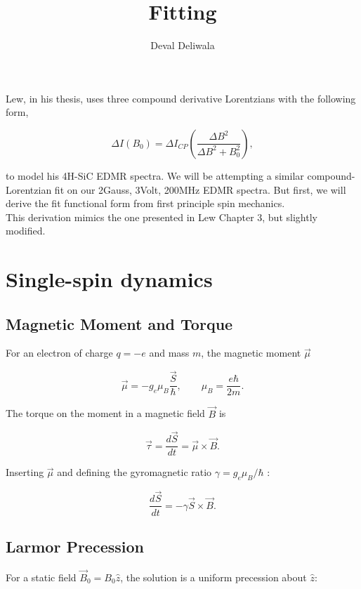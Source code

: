 \documentclass[svgnames]{article}
\title{Fitting}
\author{Deval Deliwala}
\begin{document}
\maketitle


Lew, in his thesis, uses three compound derivative Lorentzians with the following form, 

\[
    \Delta I ( B_0 ) = \Delta I_{CP} \left( \frac{\Delta B^2}{\Delta B^2 +
    B_0^2} \right),  
\] \vspace{3px}

to model his 4H-SiC EDMR spectra. We will be attempting a similar
compound-Lorentzian fit on our 2Gauss, 3Volt, 200MHz EDMR spectra. But first, we
will derive the fit functional form from first principle spin mechanics. \\

This derivation mimics the one presented in Lew Chapter 3, but slightly
modified. 

\section{Single-spin dynamics}

\subsection{Magnetic Moment and Torque}

For an electron of charge $q = -e$ and mass $m$, the magnetic moment $\vec{\mu}$ 

\[
    \vec{\mu} = -g_e \mu_B \frac{\vec{S}}{\hbar}, \qquad \mu_B =
    \frac{e\hbar}{2m}. 
\] \vspace{3px}

The torque on the moment in a magnetic field  $\vec{B}$ is 

\[
\vec{\tau} = \frac{d \vec{S}}{dt} = \vec{\mu} \times \vec{B}.
\] \vspace{3px}

Inserting $\vec{\mu}$ and defining the gyromagnetic ratio $\gamma = g_e \mu_B /
\hbar$ : 

\[
\frac{d \vec{S}}{d t} = -\gamma \vec{S} \times \vec{B}. 
\] 

\subsection{Larmor Precession} 

For a static field $\vec{B}_0 = B_0 \hat{z}$, the solution is a uniform
precession about $\hat{z}$: 
\end{document}
